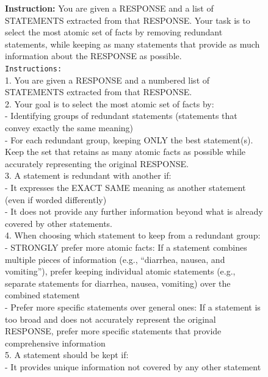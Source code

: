 \documentclass{article}
\begin{document}
\begin{figure}[t!]
\begin{small}
\centering
\begin{tcolorbox}[
    colback=gray!5,
    colframe=black,
    width=\linewidth,
    arc=2mm,
    boxrule=0.5pt,
    title=\textbf{Atomic Fact Generation (Step 5): Redundancy Filtering Prompt}
]
\textbf{Instruction:} You are given a RESPONSE and a list of STATEMENTS extracted from that RESPONSE. Your task is to select the most atomic set of facts by removing redundant statements, while keeping as many statements that provide as much information about the RESPONSE as possible.\\

\texttt{Instructions:}\\
1. You are given a RESPONSE and a numbered list of STATEMENTS extracted from that RESPONSE.\\
2. Your goal is to select the most atomic set of facts by:\\
   - Identifying groups of redundant statements (statements that convey exactly the same meaning)\\
   - For each redundant group, keeping ONLY the best statement(s). Keep the set that retains as many atomic facts as possible while accurately representing the original RESPONSE.\\
3. A statement is redundant with another if:\\
   - It expresses the EXACT SAME meaning as another statement (even if worded differently)\\
   - It does not provide any further information beyond what is already covered by other statements.\\
4. When choosing which statement to keep from a redundant group:\\
   - STRONGLY prefer more atomic facts: If a statement combines multiple pieces of information (e.g., ``diarrhea, nausea, and vomiting''), prefer keeping individual atomic statements (e.g., separate statements for diarrhea, nausea, vomiting) over the combined statement\\
   - Prefer more specific statements over general ones: If a statement is too broad and does not accurately represent the original RESPONSE, prefer more specific statements that provide comprehensive information\\
5. A statement should be kept if:\\
   - It provides unique information not covered by any other statement\\

\end{tcolorbox}
\end{small}
\end{figure}
\end{document}

